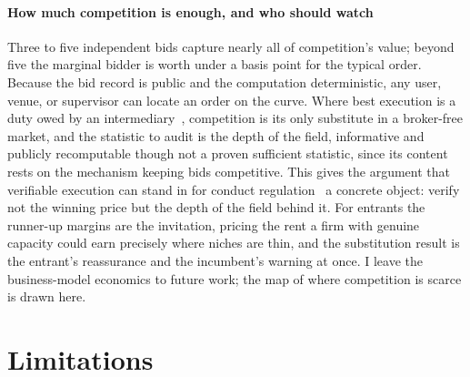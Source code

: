 \documentclass[11pt]{article}
\theoremstyle{plain}
\theoremstyle{definition}
\theoremstyle{remark}
\begin{document}
\paragraph{How much competition is enough, and who should watch} Three to five independent bids capture nearly all of competition's value; beyond five the marginal bidder is worth under a basis point for the typical order. Because the bid record is public and the computation deterministic, any user, venue, or supervisor can locate an order on the curve. Where best execution is a duty owed by an intermediary~\citep{mifid2,finsa,finra5310}, competition is its only substitute in a broker-free market, and the statistic to audit is the depth of the field, informative and publicly recomputable though not a proven sufficient statistic, since its content rests on the mechanism keeping bids competitive. This gives the argument that verifiable execution can stand in for conduct regulation~\citep{le2026fairness} a concrete object: verify not the winning price but the depth of the field behind it. For entrants the runner-up margins are the invitation, pricing the rent a firm with genuine capacity could earn precisely where niches are thin, and the substitution result is the entrant's reassurance and the incumbent's warning at once. I leave the business-model economics to future work; the map of where competition is scarce is drawn here.

\section{Limitations}\label{sec:limits}
\end{document}
